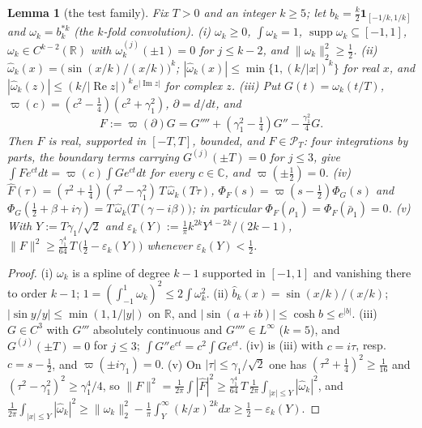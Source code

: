 \documentclass[10pt]{amsart}
\newtheorem{lemma}[theorem]{Lemma}
\theoremstyle{definition}
\theoremstyle{remark}
\newcommand{\C}{\mathbb C}
\newcommand{\R}{\mathbb R}
\newcommand{\Rel}{\operatorname{Re}}
\newcommand{\Iml}{\operatorname{Im}}
\newcommand{\supp}{\operatorname{supp}}
\newcommand{\PT}{\mathcal P_T}
\newcommand{\Fh}{\widehat F}
\begin{document}
\begin{lemma}[the test family]\label{lem:testfam}
Fix $T>0$ and an integer $k\ge5$; let $b_k=\frac k2\mathbf 1_{[-1/k,1/k]}$ and $\omega_k=b_k^{*k}$ (the
$k$-fold convolution).
\emph{(i)} $\omega_k\ge0$, $\int\omega_k=1$, $\supp\omega_k\subseteq[-1,1]$, $\omega_k\in C^{k-2}(\R)$ with
$\omega_k^{(j)}(\pm1)=0$ for $j\le k-2$, and $\|\omega_k\|_2^2\ge\frac12$.
\emph{(ii)} $\widehat\omega_k(x)=\big(\sin(x/k)/(x/k)\big)^k$; $|\widehat\omega_k(x)|\le\min\{1,(k/|x|)^k\}$ for real
$x$, and $|\widehat\omega_k(z)|\le(k/|\Rel z|)^ke^{|\Iml z|}$ for complex $z$.
\emph{(iii)} Put $G(t)=\omega_k(t/T)$, $\varpi(c)=(c^2-\frac14)(c^2+\gamma_1^2)$, $\partial=d/dt$, and
\[
F:=\varpi(\partial)G=G''''+(\gamma_1^2-\tfrac14)G''-\tfrac{\gamma_1^2}4G .
\]
Then $F$ is real, supported in $[-T,T]$, bounded, and $F\in\PT$: four integrations by parts, the
boundary terms carrying $G^{(j)}(\pm T)=0$ for $j\le3$, give $\int Fe^{ct}dt=\varpi(c)\int Ge^{ct}dt$
for every $c\in\C$, and $\varpi(\pm\frac12)=0$.
\emph{(iv)} $\Fh(\tau)=(\tau^2+\frac14)(\tau^2-\gamma_1^2)\,T\,\widehat\omega_k(T\tau)$,
$\Phi_F(s)=\varpi(s-\frac12)\Phi_G(s)$ and $\Phi_G(\frac12+\beta+i\gamma)=T\,\widehat\omega_k\big(T(\gamma-i\beta)\big)$;
in particular $\Phi_F(\rho_1)=\Phi_F(\bar\rho_1)=0$.
\emph{(v)} With $Y:=T\gamma_1/\sqrt2$ and $\varepsilon_k(Y):=\frac1\pi k^{2k}Y^{1-2k}/(2k-1)$,
$\|F\|^2\ge\frac{\gamma_1^4}{64}\,T\,\big(\frac12-\varepsilon_k(Y)\big)$ whenever $\varepsilon_k(Y)<\frac12$.
\end{lemma}
\begin{proof}
(i) $\omega_k$ is a spline of degree $k-1$ supported in $[-1,1]$ and vanishing there to order $k-1$;
$1=(\int_{-1}^1\omega_k)^2\le2\int\omega_k^2$. (ii) $\widehat b_k(x)=\sin(x/k)/(x/k)$; $|\sin y/y|\le\min(1,1/|y|)$
on $\R$, and $|\sin(a+ib)|\le\cosh b\le e^{|b|}$. (iii) $G\in C^3$ with $G'''$ absolutely continuous
and $G''''\in L^\infty$ ($k=5$), and $G^{(j)}(\pm T)=0$ for $j\le3$; $\int G''e^{ct}=c^2\int Ge^{ct}$.
(iv) is (iii) with $c=i\tau$, resp.\ $c=s-\frac12$, and $\varpi(\pm i\gamma_1)=0$. (v) On
$|\tau|\le\gamma_1/\sqrt2$ one has $(\tau^2+\frac14)^2\ge\frac1{16}$ and $(\tau^2-\gamma_1^2)^2\ge\gamma_1^4/4$,
so $\|F\|^2=\frac1{2\pi}\int|\Fh|^2\ge\frac{\gamma_1^4}{64}\,T\,\frac1{2\pi}\int_{|x|\le Y}|\widehat\omega_k|^2$, and
$\frac1{2\pi}\int_{|x|\le Y}|\widehat\omega_k|^2\ge\|\omega_k\|_2^2-\frac1\pi\int_Y^\infty(k/x)^{2k}dx\ge\frac12-\varepsilon_k(Y)$.
\end{proof}
\end{document}
